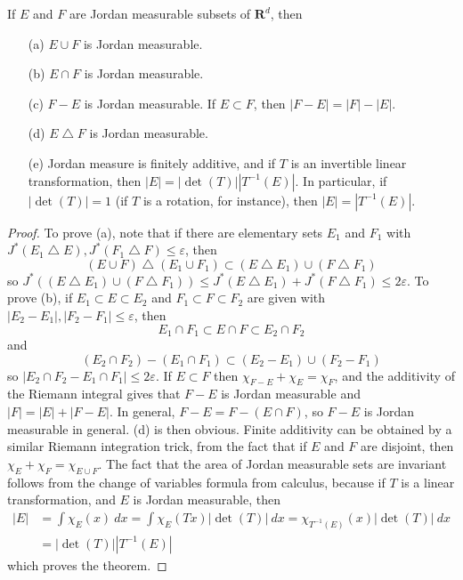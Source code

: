 \begin{theorem}
  If $E$ and $F$ are Jordan measurable subsets of $\mathbf{R}^d$, then
  \begin{enumerate}
      \item[(a)] $E \cup F$ is Jordan measurable.
      \item[(b)] $E \cap F$ is Jordan measurable.
      \item[(c)] $F - E$ is Jordan measurable. If $E \subset F$, then $|F-E| = |F| - |E|$.
      \item[(d)] $E \bigtriangleup F$ is Jordan measurable.
      \item[(e)] Jordan measure is finitely additive, and if $T$ is an invertible linear transformation, then $|E| = |\det(T)| |T^{-1}(E)|$. In particular, if $|\det(T)| = 1$ (if $T$ is a rotation, for instance), then $|E| = |T^{-1}(E)|$.
  \end{enumerate}
\end{theorem}
\begin{proof}
  To prove (a), note that if there are elementary sets $E_1$ and $F_1$ with $J^*(E_1 \bigtriangleup E), J^*(F_1 \bigtriangleup F) \leq \varepsilon$, then
  \[ (E \cup F) \bigtriangleup (E_1 \cup F_1) \subset (E \bigtriangleup E_1) \cup (F \bigtriangleup F_1) \]
  so $J^*((E \bigtriangleup E_1) \cup (F \bigtriangleup F_1)) \leq J^*(E \bigtriangleup E_1) + J^*(F \bigtriangleup F_1) \leq 2\varepsilon$. To prove (b), if $E_1 \subset E \subset E_2$ and $F_1 \subset F \subset F_2$ are given with $|E_2 - E_1|, |F_2 - F_1| \leq \varepsilon$, then
  \[ E_1 \cap F_1 \subset E \cap F \subset E_2 \cap F_2 \]
  and
  \[ (E_2 \cap F_2) - (E_1 \cap F_1) \subset (E_2 - E_1) \cup (F_2 - F_1) \]
  so $|E_2 \cap F_2 - E_1 \cap F_1| \leq 2\varepsilon$. If $E \subset F$ then $\chi_{F-E} + \chi_E = \chi_F$, and the additivity of the Riemann integral gives that $F - E$ is Jordan measurable and $|F| = |E| + |F-E|$. In general, $F - E = F - (E \cap F)$, so $F - E$ is Jordan measurable in general. (d) is then obvious. Finite additivity can be obtained by a similar Riemann integration trick, from the fact that if $E$ and $F$ are disjoint, then $\chi_E + \chi_F = \chi_{E \cup F}$. The fact that the area of Jordan measurable sets are invariant follows from the change of variables formula from calculus, because if $T$ is a linear transformation, and $E$ is Jordan measurable, then
  \begin{align*}
    |E| &= \int \chi_E(x)\ dx = \int \chi_E(Tx) |\det(T)|\ dx = \chi_{T^{-1}(E)}(x) |\det(T)|\ dx\\
    &= |\det(T)| |T^{-1}(E)|
  \end{align*}
  which proves the theorem.
\end{proof}

